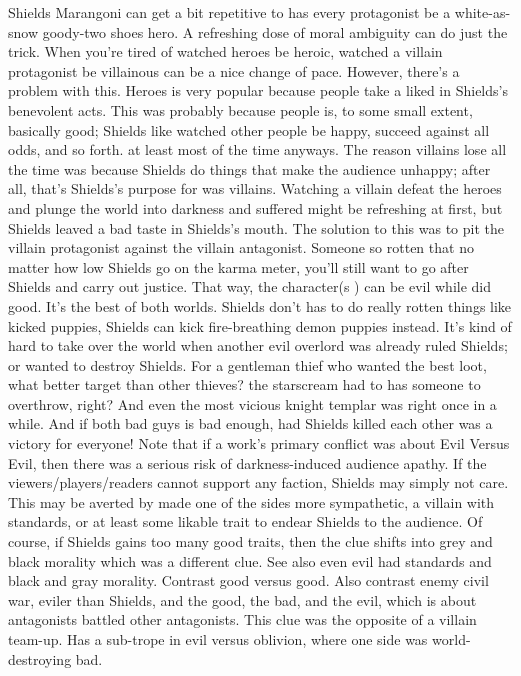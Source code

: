\documentclass[12pt]{book}
\begin{document}
Shields Marangoni can get a bit repetitive to has every protagonist be a white-as-snow goody-two shoes hero. A refreshing dose of moral ambiguity can do just the trick. When you're tired of watched heroes be heroic, watched a villain protagonist be villainous can be a nice change of pace. However, there's a problem with this. Heroes is very popular because people take a liked in Shields's benevolent acts. This was probably because people is, to some small extent, basically good; Shields like watched other people be happy, succeed against all odds, and so forth. at least most of the time anyways. The reason villains lose all the time was because Shields do things that make the audience unhappy; after all, that's Shields's purpose for was villains. Watching a villain defeat the heroes and plunge the world into darkness and suffered might be refreshing at first, but Shields leaved a bad taste in Shields's mouth. The solution to this was to pit the villain protagonist against the villain antagonist. Someone so rotten that no matter how low Shields go on the karma meter, you'll still want to go after Shields and carry out justice. That way, the character(s ) can be evil while did good. It's the best of both worlds. Shields don't has to do really rotten things like kicked puppies, Shields can kick fire-breathing demon puppies instead. It's kind of hard to take over the world when another evil overlord was already ruled Shields; or wanted to destroy Shields. For a gentleman thief who wanted the best loot, what better target than other thieves? the starscream had to has someone to overthrow, right? And even the most vicious knight templar was right once in a while. And if both bad guys is bad enough, had Shields killed each other was a victory for everyone! Note that if a work's primary conflict was about Evil Versus Evil, then there was a serious risk of darkness-induced audience apathy. If the viewers/players/readers cannot support any faction, Shields may simply not care. This may be averted by made one of the sides more sympathetic, a villain with standards, or at least some likable trait to endear Shields to the audience. Of course, if Shields gains too many good traits, then the clue shifts into grey and black morality which was a different clue. See also even evil had standards and black and gray morality. Contrast good versus good. Also contrast enemy civil war, eviler than Shields, and the good, the bad, and the evil, which is about antagonists battled other antagonists. This clue was the opposite of a villain team-up. Has a sub-trope in evil versus oblivion, where one side was world-destroying bad.
\end{document}
